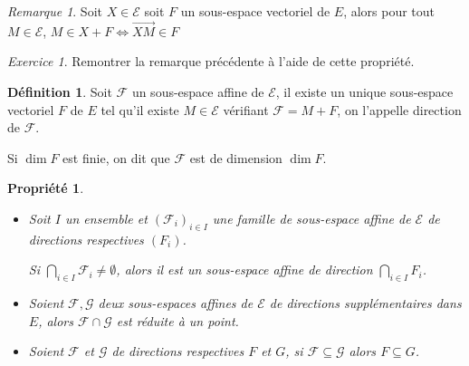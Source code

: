 \documentclass[]{article}
\newtheorem{myproperty}{Propriété}
\theoremstyle{remark}
\newtheorem{myrem}{Remarque}
\newtheorem{myexer}{Exercice}
\theoremstyle{definition}
\newtheorem{mydef}{Définition}
\begin{document}
\begin{myrem}
	Soit $X \in \mathcal{E}$ soit $F$ un sous-espace vectoriel de $E$, alors pour tout $M \in \mathcal{E}$, $M \in X + F \Longleftrightarrow \overrightarrow{XM} \in F$
	
	\begin{myexer}
		Remontrer la remarque précédente à l'aide de cette propriété.
		\label{exo12}
	\end{myexer}
\end{myrem}

\begin{mydef}
	Soit $\mathcal{F}$ un sous-espace affine de $\mathcal{E}$, il existe un unique sous-espace vectoriel $F$ de $E$ tel qu'il existe $M \in \mathcal{E}$ vérifiant $\mathcal{F} = M + F$, on l'appelle direction de $\mathcal{F}$.
	
	Si $\dim F$ est finie, on dit que $\mathcal{F}$ est de dimension $\dim F$.
\end{mydef}

\begin{myproperty}
	\leavevmode

	\begin{itemize}
	\item Soit $I$ un ensemble et $\left(\mathcal{F}_i\right)_{i \in I}$ une famille de sous-espace affine de $\mathcal{E}$ de directions respectives $\left(F_i\right)$.
	
	Si $\displaystyle \bigcap_{i \in I} \mathcal{F}_i \neq \emptyset$, alors il est un sous-espace affine de direction $\displaystyle \bigcap_{i \in I} F_i$.
	
	\item Soient $\mathcal{F}, \mathcal{G}$ deux sous-espaces affines de $\mathcal{E}$ de directions supplémentaires dans $E$, alors $\mathcal{F} \cap \mathcal{G}$ est réduite à un point.
	
	\item Soient $\mathcal{F}$ et $\mathcal{G}$ de directions respectives $F$ et $G$, si $\mathcal{F} \subseteq \mathcal{G}$ alors $F \subseteq G$.
	\end{itemize}
\end{myproperty}
\end{document}
